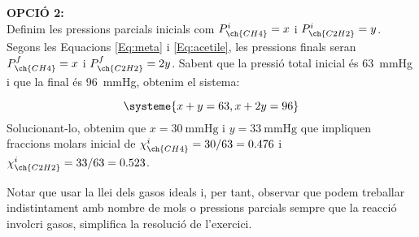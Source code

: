 {    \textbf{OPCIÓ 2:\\}
Definim les pressions parcials inicials com $P_{\ch{CH4}}^i=x$ i $P_{\ch{C2H2}}^i=y$. Segons les Equacions \ref{Eq:meta} i \ref{Eq:acetile}, les pressions finals seran $P_{\ch{CH4}}^f=x$ i $P_{\ch{C2H2}}^f=2y$. Sabent que la pressió total inicial és \qty{63}{\mmHg} i que la final és \qty{96}{\mmHg}, obtenim el sistema:

\[
\systeme{x+y=63,x+2y=96}
\]
Solucionant-lo, obtenim que $x=\qty{30}{\mmHg}$ i $y=\qty{33}{\mmHg}$ 
que impliquen fraccions molars inicial de $\chi_{\ch{CH4}}^i=30/63=0.476$ i $\chi_{\ch{C2H2}}^i=33/63=0.523$.

Notar que usar la llei dels gasos ideals i, per tant, observar que podem treballar indistintament amb nombre de mols o pressions parcials sempre que la reacció involcri gasos, simplifica la resolució de l'exercici.


}
